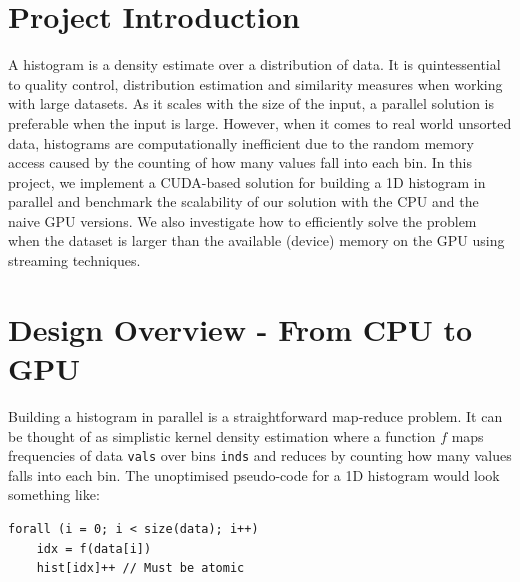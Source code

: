 \documentclass[12pt, a4paper, hidelinks]{article}
\renewcommand{\tt}[1]{\texttt{#1}}
\begin{document}

\tableofcontents
\newpage

\section{Project Introduction}
A histogram is a density estimate over a distribution of data.
It is quintessential to quality control, distribution estimation
and similarity measures when working with large datasets.
As it scales with the size of the input,
a parallel solution is preferable when the input is large.
However, when it comes to real world unsorted data,
histograms are computationally inefficient
due to the random memory access caused by
the counting of how many values fall into each bin.
In this project, we implement a CUDA-based solution for building a 1D histogram
in parallel and benchmark the scalability of our solution with
the CPU and the naive GPU versions.
We also investigate how to efficiently solve the problem when the dataset
is larger than the available (device) memory on the GPU
using streaming techniques.

\section{Design Overview - From CPU to GPU}
Building a histogram in parallel is a straightforward map-reduce problem.
It can be thought of as simplistic kernel density estimation
where a function $f$ maps frequencies of data \tt{vals} over bins \tt{inds}
and reduces by counting how many values falls into each bin.
The unoptimised pseudo-code for a 1D histogram
would look something like:

\begin{verbatim}
forall (i = 0; i < size(data); i++)
    idx = f(data[i])
    hist[idx]++ // Must be atomic
\end{verbatim}
\end{document}
